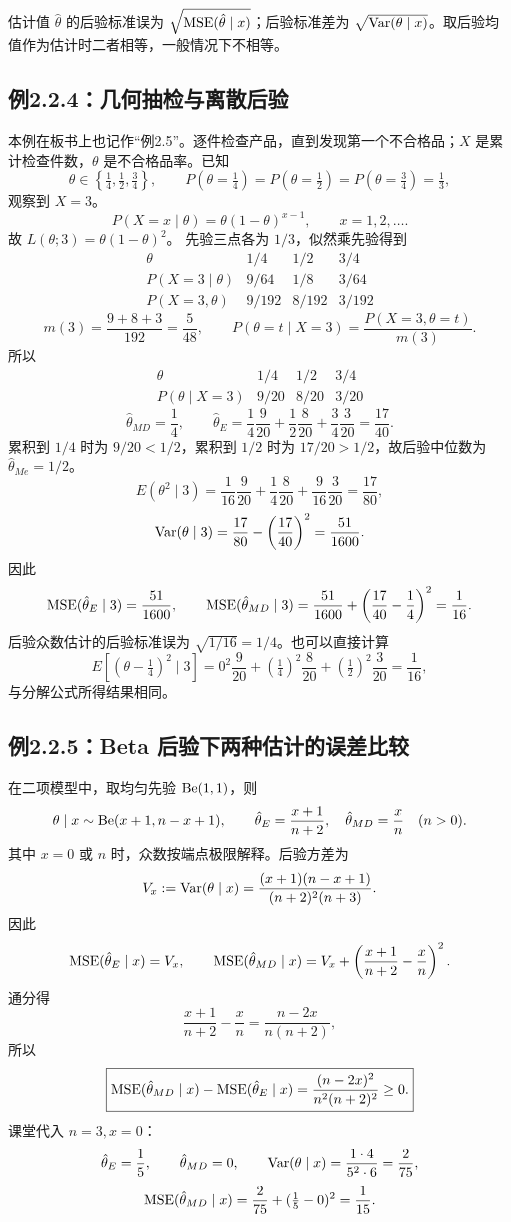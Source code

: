 估计值 $\hat\theta$ 的后验标准误为 $\sqrt{\operatorname{MSE}(\hat\theta\mid x)}$；后验标准差为 $\sqrt{\operatorname{Var}(\theta\mid x)}$。取后验均值作为估计时二者相等，一般情况下不相等。

\subsection{例2.2.4：几何抽检与离散后验}
本例在板书上也记作“例2.5”。逐件检查产品，直到发现第一个不合格品；$X$ 是累计检查件数，$\theta$ 是不合格品率。已知
\[
\theta\in\left\{\tfrac14,\tfrac12,\tfrac34\right\},\qquad
P(\theta=\tfrac14)=P(\theta=\tfrac12)=P(\theta=\tfrac34)=\tfrac13,
\]
观察到 $X=3$。
\[
P(X=x\mid\theta)=\theta(1-\theta)^{x-1},\qquad x=1,2,\ldots.
\]
故 $L(\theta;3)=\theta(1-\theta)^2$。
先验三点各为 $1/3$，似然乘先验得到
\[
\begin{array}{c|ccc}
\theta&1/4&1/2&3/4\\\hline
P(X=3\mid\theta)&9/64&1/8&3/64\\
P(X=3,\theta)&9/192&8/192&3/192
\end{array}
\]
\[
m(3)=\frac{9+8+3}{192}=\frac5{48},\qquad
P(\theta=t\mid X=3)=\frac{P(X=3,\theta=t)}{m(3)}.
\]
所以
\[
\begin{array}{c|ccc}
\theta&1/4&1/2&3/4\\\hline
P(\theta\mid X=3)&9/20&8/20&3/20
\end{array}
\]
\[
\hat\theta_{MD}=\frac14,\qquad
\hat\theta_E=\frac14\frac9{20}+\frac12\frac8{20}+\frac34\frac3{20}
=\frac{17}{40}.
\]
累积到 $1/4$ 时为 $9/20<1/2$，累积到 $1/2$ 时为 $17/20>1/2$，故后验中位数为 $\hat\theta_{Me}=1/2$。
\[
E(\theta^2\mid3)=\frac1{16}\frac9{20}+\frac14\frac8{20}+\frac9{16}\frac3{20}
=\frac{17}{80},
\]
\[
\operatorname{Var}(\theta\mid3)=\frac{17}{80}-\left(\frac{17}{40}\right)^2
=\frac{51}{1600}.
\]
因此
\[
\operatorname{MSE}(\hat\theta_E\mid3)=\frac{51}{1600},\qquad
\operatorname{MSE}(\hat\theta_{MD}\mid3)=\frac{51}{1600}
+\left(\frac{17}{40}-\frac14\right)^2=\frac1{16}.
\]
后验众数估计的后验标准误为 $\sqrt{1/16}=1/4$。也可以直接计算
\[
E[(\theta-\tfrac14)^2\mid3]
=0^2\frac9{20}+(\tfrac14)^2\frac8{20}+(\tfrac12)^2\frac3{20}
=\frac1{16},
\]
与分解公式所得结果相同。

\subsection{例2.2.5：Beta 后验下两种估计的误差比较}
在二项模型中，取均匀先验 $\operatorname{Be}(1,1)$，则
\[
\theta\mid x\sim\operatorname{Be}(x+1,n-x+1),\qquad
\hat\theta_E=\frac{x+1}{n+2},\quad\hat\theta_{MD}=\frac xn\quad(n>0).
\]
其中 $x=0$ 或 $n$ 时，众数按端点极限解释。后验方差为
\[
V_x:=\operatorname{Var}(\theta\mid x)=\frac{(x+1)(n-x+1)}{(n+2)^2(n+3)}.
\]
因此
\[
\operatorname{MSE}(\hat\theta_E\mid x)=V_x,\qquad
\operatorname{MSE}(\hat\theta_{MD}\mid x)=V_x+
\left(\frac{x+1}{n+2}-\frac xn\right)^2.
\]
通分得
\[
\frac{x+1}{n+2}-\frac xn=\frac{n-2x}{n(n+2)},
\]
所以
\[
\boxed{\operatorname{MSE}(\hat\theta_{MD}\mid x)-\operatorname{MSE}(\hat\theta_E\mid x)
=\frac{(n-2x)^2}{n^2(n+2)^2}\geq0.}
\]
课堂代入 $n=3,x=0$：
\[
\hat\theta_E=\frac15,\qquad\hat\theta_{MD}=0,\qquad
\operatorname{Var}(\theta\mid x)=\frac{1\cdot4}{5^2\cdot6}=\frac2{75},
\]
\[
\operatorname{MSE}(\hat\theta_{MD}\mid x)=\frac2{75}+(\tfrac15-0)^2=\frac1{15}.
\]

